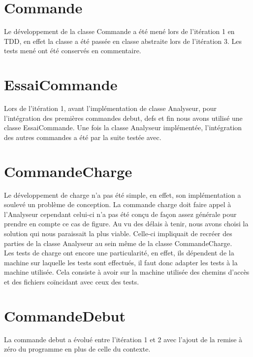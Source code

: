 
\section{Commande}

Le développement de la classe Commande a été mené lors de l'itération 1
en TDD, en effet la classe a été passée en classe abstraite lors de
l'itération 3. Les tests mené ont été conservés en commentaire.

\section{EssaiCommande}

Lors de l'itération 1, avant l'implémentation de classe Analyseur, pour
l'intégration des premières commandes debut, defs et fin nous avons utilisé
une classe EssaiCommande. Une fois la classe Analyseur implémentée, l'intégration
des autres commandes a été par la suite testée avec.

\section{CommandeCharge}

Le développement de charge n'a pas été simple, en effet, son implémentation
a soulevé un problème de conception. La commande charge doit faire appel à
l'Analyseur cependant celui-ci n'a pas été conçu de façon assez générale pour
prendre en compte ce cas de figure. Au vu des délais à tenir, nous avons choisi
la solution qui nous paraissait la plus viable. Celle-ci impliquait de recréer
des parties de la classe Analyseur au sein même de la classe CommandeCharge.
\\ Les tests de charge ont encore une particularité, en effet, ils dépendent
de la machine sur laquelle les tests sont effectués, il faut donc adapter les
tests à la machine utilisée. Cela consiste à avoir sur la machine utilisée des
chemins d'accès et des fichiers coïncidant avec ceux des tests.

\section{CommandeDebut}
La commande debut a évolué entre l'itération 1 et 2 avec l'ajout de la remise
à zéro du programme en plus de celle du contexte.

